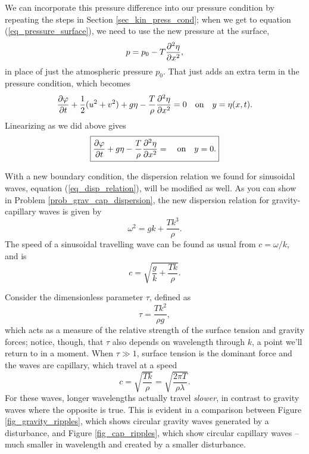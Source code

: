We can incorporate this pressure difference into our pressure condition by repeating the steps in Section \ref{sec_kin_press_cond}; when we get to equation (\ref{eq_pressure_surface}), we need to use the new pressure at the surface, 
\[
p = p_0 - T \frac{\partial^2 {\eta}}{\partial {x}^2},
\]
in place of just the atmospheric pressure $p_0$.  That just adds an extra term in the pressure condition, which becomes
\begin{equation}
\label{eq_pressure_cond_cap}
\frac{\partial {\varphi}}{\partial {t}} +  \frac{1}{2}(u^2 + v^2) + g\eta  - \frac{T}{\rho} \frac{\partial^2 {\eta}}{\partial {x}^2} = 0 \quad \text{on} \quad y = \eta(x, t).
\end{equation}
Linearizing as we did above gives
\begin{equation}
\label{eq_pressure_cond_cap_lin}
\boxed{
\frac{\partial {\varphi}}{\partial {t}} + g\eta - \frac{T}{\rho} \frac{\partial^2 {\eta}}{\partial {x}^2} = \quad \text{on} \quad y=0.
}
\end{equation}

With a new boundary condition, the dispersion relation we found for sinusoidal waves, equation (\ref{eq_disp_relation}), will be modified as well.  As you can show in Problem \ref{prob_grav_cap_dispersion}, the new dispersion relation for gravity-capillary waves is given by
\begin{equation}
\boxed{
\omega^2 = gk + \frac{Tk^3}{\rho}.
}
\end{equation}
The speed of a sinusoidal travelling wave can be found as usual from $c = \omega/k$, and is
\begin{equation}
c = \sqrt{ \frac{g}{k} + \frac{Tk}{\rho} }.
\end{equation}

Consider the dimensionless parameter $\tau$, defined as
\begin{equation}
\tau = \frac{Tk^2}{\rho g},
\end{equation}
which acts as a measure of the relative strength of the surface tension and gravity forces; notice, though, that $\tau$ also depends on wavelength through $k$, a point we'll return to in a moment.  When $\tau \gg 1$, surface tension is the dominant force and the waves are capillary, which travel at a speed
\begin{equation}
c = \sqrt{\frac{Tk}{\rho}} = \sqrt{ \frac{2\pi T}{\rho \lambda}}.
\end{equation}
For these waves, longer wavelengths actually travel \emph{slower}, in contrast to gravity waves where the opposite is true.  This is evident in a comparison between Figure \ref{fig_gravity_ripples}, which shows circular gravity waves generated by a disturbance, and Figure \ref{fig_cap_ripples}, which show circular capillary waves -- much smaller in wavelength and created by a smaller disturbance.  

